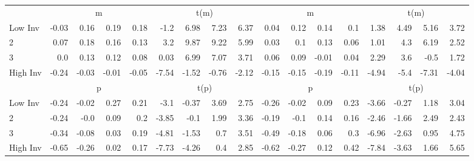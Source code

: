 \begin{table}[!ht]
\begin{tabular}{lrrrrrrrrrrrrrrrr}
  
    
      & \multicolumn{4}{c}{m} & \multicolumn{4}{c}{t(m)}
    
      & \multicolumn{4}{c}{m} & \multicolumn{4}{c}{t(m)}
    
    \\
      \cmidrule(r){2-5} \cmidrule(r){6-9} \cmidrule(r){10-13} \cmidrule(r){14-17}

    Low Inv   & -0.03  & 0.16  & 0.19  & 0.18  & -1.2  & 6.98  & 7.23  & 6.37  & 0.04  & 0.12  & 0.14  & 0.1  & 1.38  & 4.49  & 5.16  & 3.72  \\
           2  & 0.07  & 0.18  & 0.16  & 0.13  & 3.2  & 9.87  & 9.22  & 5.99  & 0.03  & 0.1  & 0.13  & 0.06  & 1.01  & 4.3  & 6.19  & 2.52  \\
           3  & 0.0  & 0.13  & 0.12  & 0.08  & 0.03  & 6.99  & 7.07  & 3.71  & 0.06  & 0.09  & -0.01  & 0.04  & 2.29  & 3.6  & -0.5  & 1.72  \\
    High Inv  & -0.24  & -0.03  & -0.01  & -0.05  & -7.54  & -1.52  & -0.76  & -2.12  & -0.15  & -0.15  & -0.19  & -0.11  & -4.94  & -5.4  & -7.31  & -4.04  \\

  
    
      & \multicolumn{4}{c}{p} & \multicolumn{4}{c}{t(p)}
    
      & \multicolumn{4}{c}{p} & \multicolumn{4}{c}{t(p)}
    
    \\
      \cmidrule(r){2-5} \cmidrule(r){6-9} \cmidrule(r){10-13} \cmidrule(r){14-17}

    Low Inv   & -0.24  & -0.02  & 0.27  & 0.21  & -3.1  & -0.37  & 3.69  & 2.75  & -0.26  & -0.02  & 0.09  & 0.23  & -3.66  & -0.27  & 1.18  & 3.04  \\
           2  & -0.24  & -0.0  & 0.09  & 0.2  & -3.85  & -0.1  & 1.99  & 3.36  & -0.19  & -0.1  & 0.14  & 0.16  & -2.46  & -1.66  & 2.49  & 2.43  \\
           3  & -0.34  & -0.08  & 0.03  & 0.19  & -4.81  & -1.53  & 0.7  & 3.51  & -0.49  & -0.18  & 0.06  & 0.3  & -6.96  & -2.63  & 0.95  & 4.75  \\
    High Inv  & -0.65  & -0.26  & 0.02  & 0.17  & -7.73  & -4.26  & 0.4  & 2.85  & -0.62  & -0.27  & 0.12  & 0.42  & -7.84  & -3.63  & 1.66  & 5.65  \\

  

  \bottomrule
\end{tabular}
\label{tbl:32_Size_OP_Inv_BS2015}
\end{table}